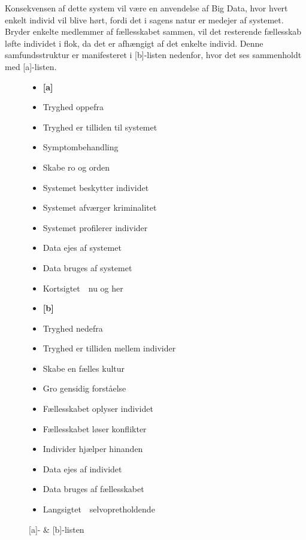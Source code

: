 Konsekvensen af dette system vil være en anvendelse af Big Data, hvor hvert enkelt individ vil blive hørt, fordi det i sagens natur er medejer af systemet. %
Bryder enkelte medlemmer af fællesskabet sammen, vil det resterende fællesskab løfte individet i flok, da det er afhængigt af det enkelte individ. Denne samfundsstruktur er manifesteret i [b]-listen nedenfor, hvor det ses sammenholdt med [a]-listen.

\begin{figure}[H]
    \centering
    
\begin{multicols}{2}
\begin{itemize}
    \sloppy
    \item[] \textbf{[a]}
    \item Tryghed oppefra
    \item Tryghed er tilliden til systemet
    \item Symptombehandling
    \item Skabe ro og orden
    \item Systemet beskytter individet
    \item Systemet afværger kriminalitet
    \item Systemet profilerer individer
    \item Data ejes af systemet
    \item Data bruges af systemet
    \item Kortsigtet~\textrightarrow~nu og her

    \item[] \textbf{[b]}    
    \item Tryghed nedefra
    \item Tryghed er tilliden mellem individer
    \item Skabe en fælles kultur
    \item Gro gensidig forståelse
    \item Fællesskabet oplyser individet
    \item Fællesskabet løser konflikter
    \item Individer hjælper hinanden
    \item Data ejes af individet
    \item Data bruges af fællesskabet
    \item Langsigtet~\textrightarrow~selvopretholdende
    
\end{itemize}
\end{multicols}
    \caption{[a]- \& [b]-listen}
    \label{fig:a_b_liste}
\end{figure}

